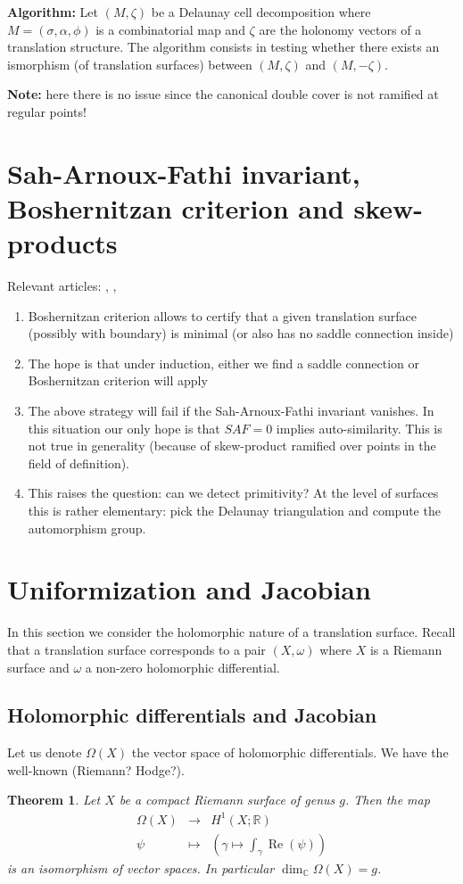 \documentclass[a4paper,12pt]{article}
\def\bC{\mathbb{C}}
\def\bR{\mathbb{R}}
\def\Re{\operatorname{Re}}
\newtheorem{theorem}[definition]{Theorem}
\begin{document}
\textbf{Algorithm:} Let $(M, \zeta)$ be a Delaunay cell decomposition where $M
= (\sigma, \alpha, \phi)$ is a combinatorial map and $\zeta$ are the holonomy
vectors of a translation structure.  The algorithm consists in testing whether
there exists an ismorphism (of translation surfaces) between $(M, \zeta)$ and
$(M, -\zeta)$.

\textbf{Note:} here there is no issue since the canonical double cover is not
ramified at regular points!

\section{Sah-Arnoux-Fathi invariant, Boshernitzan criterion and skew-products}
Relevant articles: \cite{DoSchmidt}, \cite{DynnikovSkripchenko}, \cite{Boshernitzan}

\begin{enumerate}
\item Boshernitzan criterion allows to certify that a given translation surface (possibly with boundary)
is minimal (or also has no saddle connection inside)
\item The hope is that under induction, either we find a saddle connection or Boshernitzan criterion will apply
\item The above strategy will fail if the Sah-Arnoux-Fathi invariant vanishes. In this situation our only
hope is that $SAF=0$ implies auto-similarity. This is not true in generality (because of skew-product ramified
over points in the field of definition).
\item This raises the question: can we detect primitivity? At the level of
surfaces this is rather elementary: pick the Delaunay triangulation and compute
the automorphism group.
\end{enumerate}

\section{Uniformization and Jacobian}
In this section we consider the holomorphic nature of a translation surface. Recall that a translation
surface corresponds to a pair $(X, \omega)$ where $X$ is a Riemann surface and $\omega$ a non-zero
holomorphic differential.

\subsection{Holomorphic differentials and Jacobian}
Let us denote $\Omega(X)$ the vector space of holomorphic differentials.
We have the well-known (Riemann? Hodge?).
\begin{theorem}
Let $X$ be a compact Riemann surface of genus $g$. Then the map 
\[
\begin{array}{lll}
\Omega(X) & \to & H^1(X; \bR) \\
\psi & \mapsto & (\gamma \mapsto \int_\gamma \Re(\psi))
\end{array}
\]
is an isomorphism of vector spaces. In particular $\dim_\bC \Omega(X) = g$.
\end{theorem}
\end{document}
